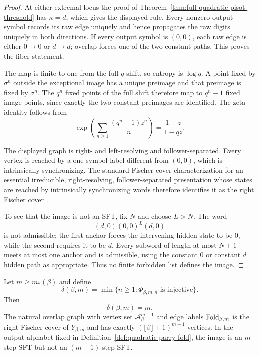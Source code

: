 \begin{proof}
At either extremal locus the proof of
Theorem~\ref{thm:full-quadratic-pisot-threshold} has $\kappa=d$, which gives
the displayed rule.  Every nonzero output symbol records its raw edge
uniquely and hence propagates the raw digits uniquely in both directions.
If every output symbol is $(0,0)$, each raw edge is either $0\to0$ or
$d\to d$; overlap forces one of the two constant paths.  This proves the
fiber statement.

The map is finite-to-one from the full $q$-shift, so entropy is $\log q$.
A point fixed by $\sigma^n$ outside the exceptional image has a unique
preimage and that preimage is fixed by $\sigma^n$.  The $q^n$ fixed points
of the full shift therefore map to $q^n-1$ fixed image points, since exactly
the two constant preimages are identified.  The zeta identity follows from
\[
\exp\left(\sum_{n\ge1}\frac{(q^n-1)z^n}{n}\right)
=\frac{1-z}{1-qz}.
\]

The displayed graph is right- and left-resolving and follower-separated.
Every vertex is reached by a one-symbol label different from $(0,0)$, which
is intrinsically synchronizing.  The standard Fischer-cover characterization
for an essential irreducible, right-resolving, follower-separated
presentation whose states are reached by intrinsically synchronizing words
therefore identifies it as the right Fischer cover
\cite{Fischer1975,Krieger1984,LindMarcus1995}.

To see that the image is not an SFT, fix $N$ and choose $L>N$.  The word
\[
(d,0)(0,0)^L(d,0)
\]
is not admissible: the first anchor forces the intervening hidden state to be
$0$, while the second requires it to be $d$.  Every subword of length at
most $N+1$ meets at most one anchor and is admissible, using the constant
$0$ or constant $d$ hidden path as appropriate.  Thus no finite forbidden
list defines the image.
\end{proof}

\begin{theorem}
\label{thm:quadratic-exact-local-order}
Let $m\ge m_*(\beta)$ and define
\[
\delta(\beta,m)=\min\{n\ge1:\Phi_{\beta,m,n}\text{ is injective}\}.
\]
Then
\[
\delta(\beta,m)=m.
\]
The natural overlap graph with vertex set
$\mathcal A_\beta^{m-1}$ and edge labels $\mathrm{Fold}_{\beta,m}$ is the right
Fischer cover of $Y_{\beta,m}$ and has exactly
$(\lfloor\beta\rfloor+1)^{m-1}$ vertices.  In the output alphabet fixed in
Definition~\ref{def:quadratic-parry-fold}, the image is an $m$-step SFT but
not an $(m-1)$-step SFT.
\end{theorem}

